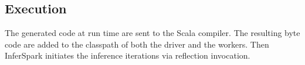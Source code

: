 \subsection{Execution}

The generated code at run time are sent to the Scala compiler. The resulting
byte code are added to the classpath of both the driver and the workers. Then
InferSpark initiates the inference iterations via reflection invocation.

%
% 
%
%
%
%


